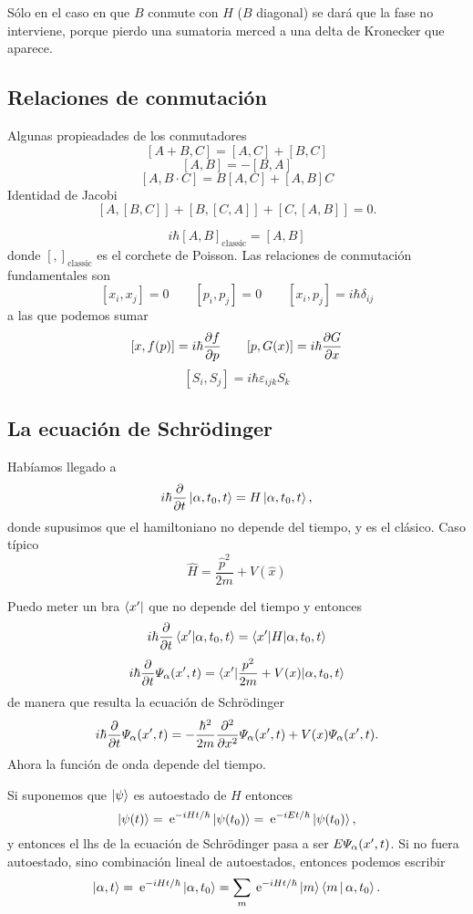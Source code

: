 \documentclass[10pt,oneside]{CBFT_book}
\begin{document}
Sólo en el caso en que $B$ conmute con $H$ ($B$ diagonal) se dará que la fase no interviene,
porque pierdo una sumatoria merced a una delta de Kronecker que aparece.

\subsection{Relaciones de conmutación}

Algunas propieadades de los conmutadores
\[
	[ A + B, C] = [A, C] + [B,C] 
\]
\[
	[A, B] = - [B,A]
\]
\[
	[A, B\cdot C] = B[A,C] +  [A,B]C
\]
Identidad de Jacobi
\[
	[ A, [B,C] ] +  [ B, [C,A] ] + [ C, [A,B] ] = 0.
\]

\[
	i\hbar[ A, B]_{\text{classic}} = [A, B]
\]
donde $[ , ]_{\text{classic}}$ es el corchete de Poisson.
Las relaciones de conmutación fundamentales son 
\[
	[x_i, x_j] = 0 \qquad [p_i, p_j]=0 \qquad [x_i,p_j] =i\hbar\delta_{ij}
\]
a las que podemos sumar
\[
	[x,f(p)] = i\hbar\dpar{f}{p} \qquad [p,G(x)] = i\hbar\dpar{G}{x} 
\]
\[
	[S_i,S_j] = i\hbar \varepsilon_{ijk}S_k
\]

\subsection{La ecuación de Schrödinger}

Habíamos llegado a
\[
	i\hbar\dpar{}{t}\Ket{\alpha,t_0,t} = H\Ket{\alpha,t_0,t},
\]
donde supusimos que el hamiltoniano no depende del tiempo, y es el clásico. Caso típico
\[
	\hat{H} = \frac{\hat{p}^2}{2m} + V(\hat{x}) 
\]

Puedo meter un bra $\Bra{x'}$ que no depende del tiempo y entonces 
\[
	i\hbar\dpar{}{t}\braket{x'|\alpha,t_0,t} = \braket{x'|H|\alpha,t_0,t}
\]
\[
	i\hbar\dpar{}{t}\Psi_\alpha(x',t) = \braket{x'|\frac{p^2}{2m} + V(x)|\alpha,t_0,t}
\]
de manera que resulta la ecuación de Schrödinger
\[
	i\hbar\dpar{}{t}\Psi_\alpha(x',t) = -\frac{\hbar^2}{2m}\dpar[2]{}{x}\Psi_\alpha(x',t) + 
	V(x)\Psi_\alpha(x',t).
\]
Ahora la función de onda depende del tiempo.

Si suponemos que $\Ket{\psi}$ es autoestado de $H$ entonces
\[
	\Ket{\psi(t)} = \euler^{-iHt/\hbar} \Ket{\psi(t_0)} = \euler^{-iEt/\hbar} \Ket{\psi(t_0)},
\]
y entonces el lhs de la ecuación de Schrödinger pasa a ser $E \Psi_\a(x',t)$.
Si no fuera autoestado, sino combinación lineal de autoestados, entonces podemos escribir
\[
	\Ket{\a,t} =  \euler^{-iHt/\hbar} \Ket{\a,t_0} = 
	\sum_m \euler^{-iHt/\hbar} \Ket{m}\Braket{m|\a,t_0}.
\]
\end{document}
